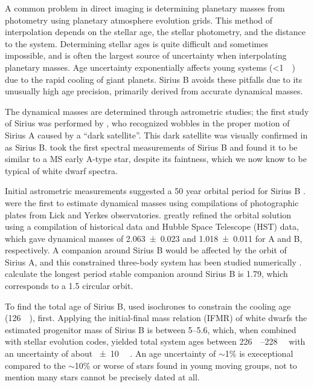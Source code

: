 \documentclass[twocolumn]{aastex631}
\begin{document}
A common problem in direct imaging is determining planetary masses from photometry using planetary atmosphere evolution grids. This method of interpolation depends on the stellar age, the stellar photometry, and the distance to the system. Determining stellar ages is quite difficult and sometimes impossible, and is often the largest source of uncertainty when interpolating planetary masses. Age uncertainty exponentially affects young systems (\textless\qty{1}{\giga\year}) due to the rapid cooling of giant planets. Sirius B avoids these pitfalls due to its unusually high age precision, primarily derived from accurate dynamical masses.

The dynamical masses are determined through astrometric studies; the first study of Sirius was performed by \citet{bessel_variations_1844}, who recognized wobbles in the proper motion of Sirius A caused by a ``dark satellite''. This dark satellite was visually confirmed in \citet{bond_companion_1862} as Sirius B. \citet{adams_spectrum_1915} took the first spectral measurements of Sirius B and found it to be similar to a MS early A-type star, despite its faintness, which we now know to be typical of white dwarf spectra.

Initial astrometric measurements suggested a 50 year orbital period for Sirius B \citep{auwers_orbit_1864}. \citet{van_den_bos_orbit_1960,gatewood_study_1978} were the first to estimate dynamical masses using compilations of photographic plates from Lick and Yerkes observatories. \citet{bond_sirius_2017} greatly refined the orbital solution using a compilation of historical data and Hubble Space Telescope (HST) data, which gave dynamical masses of \qty{2.063+-0.023}{\solarmass} and \qty{1.018+-0.011}{\solarmass} for A and B, respectively. A companion around Sirius B would be affected by the orbit of Sirius A, and this constrained three-body system has been studied numerically \citep{holman_long-term_1999}. \citet{bond_sirius_2017} calculate the longest period stable companion around Sirius B is \qty{1.79}{\year}, which corresponds to a \qty{1.5}{\au} circular orbit.

To find the total age of Sirius B, \citet{bond_sirius_2017} used isochrones to constrain the cooling age (\qty{126}{\mega\year}), first. Applying the initial-final mass relation (IFMR) of white dwarfs \citep{cummings_two_2016} the estimated progenitor mass of Sirius B is between \qtyrange{5}{5.6}{\solarmass}, which, when combined with stellar evolution codes, yielded total system ages between \qtyrange{226}{228}{\mega\year} with an uncertainty of about \qty{+-10}{\mega\year} \citep{bond_sirius_2017}. An age uncertainty of $\sim$1\% is execeptional compared to the $\sim$10\% or worse of stars found in young moving groups, not to mention many stars cannot be precisely dated at all.
\end{document}
